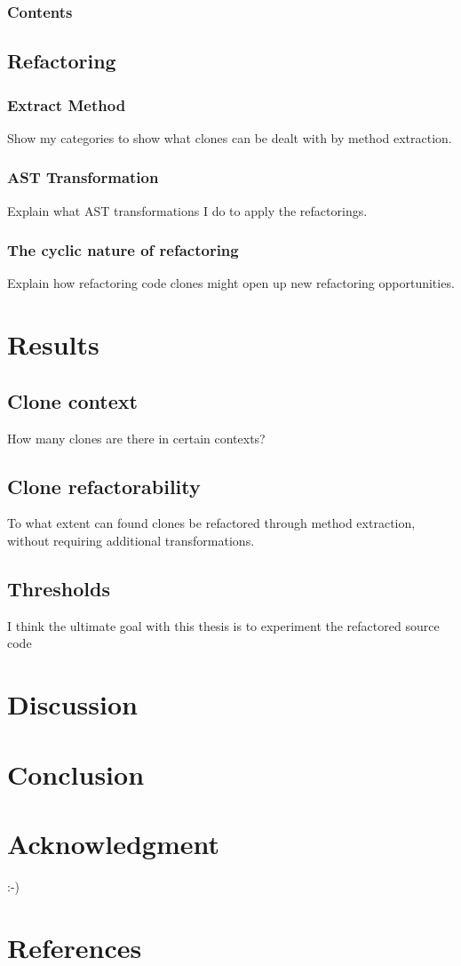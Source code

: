 \documentclass[conference]{IEEEtran}
\begin{document}
\subsubsection{Contents}

\subsection{Refactoring}
\subsubsection{Extract Method}
Show my categories to show what clones can be dealt with by method extraction.

\subsubsection{AST Transformation}
Explain what AST transformations I do to apply the refactorings.

\subsubsection{The cyclic nature of refactoring}
Explain how refactoring code clones might open up new refactoring opportunities.

\section{Results}

\subsection{Clone context}
How many clones are there in certain contexts?

\subsection{Clone refactorability}
To what extent can found clones be refactored through method extraction, without requiring additional transformations.

\subsection{Thresholds}
I think the ultimate goal with this thesis is to experiment the refactored source code

\section{Discussion}


\section{Conclusion}

\section*{Acknowledgment}
:-)

\section*{References}
\end{document}
